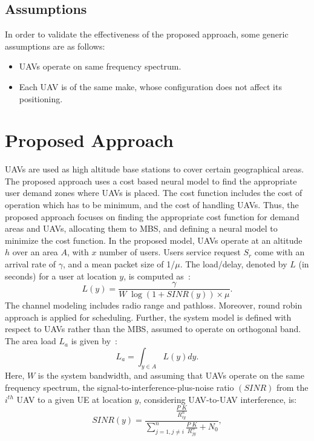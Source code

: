 \documentclass[journal]{IEEEtran}
\begin{document}
\subsection{Assumptions}
In order to validate the effectiveness of the proposed approach, some generic assumptions are as follows:
\begin{itemize}
  \item UAVs operate on same frequency spectrum.
  \item Each UAV is of the same make, whose configuration does not affect its positioning.
\end{itemize}
\section{Proposed Approach}
UAVs are used as high altitude base stations to cover certain geographical areas. The proposed approach uses a cost based neural model to find the appropriate user demand zones where UAVs is placed. The cost function includes the cost of operation which has to be minimum, and the cost of handling UAVs. Thus, the proposed approach focuses on finding the appropriate cost function for demand areas and UAVs, allocating them to MBS, and defining a neural model to minimize the cost function. In the proposed model, UAVs operate at an altitude $h$ over an area $A$, with $x$ number of users. Users service request $S_{r}$ come with an arrival rate of $\gamma$, and a mean packet size of 1/$\mu$. The load/delay, denoted by $L$ (in seconds) for a user at location $y$, is computed as~\cite{samarakoon2014opportunistic}:
\begin{equation}\label{eq:d1}
L (y) =\frac{\gamma}{W \;\log(1+SINR(y))\times \mu}.
\end{equation}
The channel modeling includes radio range and pathloss. Moreover, round robin approach is applied for scheduling. Further, the system model is defined with respect to UAVs rather than the MBS, assumed to operate on orthogonal band. The area load $L_{a}$ is given by~\cite{samarakoon2014opportunistic}:
\begin{equation}\label{eq:d2}
L_{a}=\int_{y \in A} L(y) dy.
\end{equation}
Here, $W$ is the system bandwidth, and assuming that UAVs operate on the same frequency spectrum, the signal-to-interference-plus-noise ratio $\left(SINR\right)$ from the $i^{th}$ UAV to a given UE at location $y$, considering UAV-to-UAV interference, is:
\begin{equation}
SINR(y)= \frac{\frac{P \; K  }{R_{iy}^{\alpha}}}{\sum_{j=1, j\neq i}^{n} \frac{P \;K}{ R_{jy}^{\alpha}} + N_{0}},
\end{equation}
\end{document}
